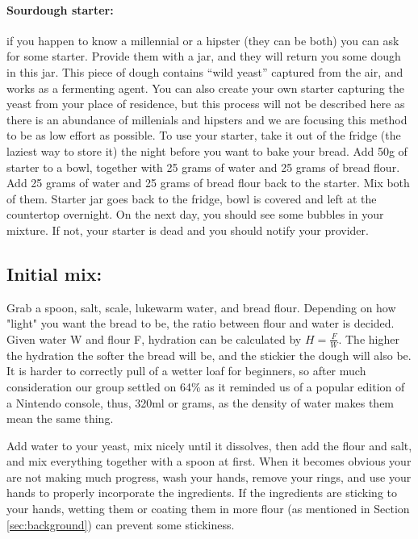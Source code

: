 \documentclass[acmtog, nonacm]{acmart}
\begin{document}
\paragraph{Sourdough starter:} if you happen to know a millennial or a hipster (they can be both) you can ask for some starter. 
Provide them with a jar, and they will return you some dough in this jar. 
This piece of dough contains ``wild yeast'' captured from the air, and works as a fermenting agent. 
You can also create your own starter capturing the yeast from your place of residence, but this process will not be described here as there is an abundance of millenials and hipsters and we are focusing this method to be as low effort as possible.
To use your starter, take it out of the fridge (the laziest way to store it) the night before you want to bake your bread.
Add 50g of starter to a bowl, together with 25 grams of water and 25 grams of bread flour.
Add 25 grams of water and 25 grams of bread flour back to the starter. 
Mix both of them. 
Starter jar goes back to the fridge, bowl is covered and left at the countertop overnight. 
On the next day, you should see some bubbles in your mixture.
If not, your starter is dead and you should notify your provider. 

\subsection{Initial mix:}
\label{sec:initialmix}

Grab a spoon, salt, scale, lukewarm water, and bread flour.
Depending on how "light" you want the bread to be, the ratio between flour and water is decided. 
Given water W and flour F, hydration can be calculated by $H = \frac{F}{W}$.
The higher the hydration the softer the bread will be, and the stickier the dough will also be. 
It is harder to correctly pull of a wetter loaf for beginners, so after much consideration our group settled on 64\% as it reminded us of a popular edition of a Nintendo console, thus, 320ml or grams, as the density of water makes them mean the same thing. 

Add water to your yeast, mix nicely until it dissolves, then add the flour and salt, and mix everything together with a spoon at first. 
When it becomes obvious your are not making much progress, wash your hands, remove your rings, and use your hands to properly incorporate the ingredients. 
If the ingredients are sticking to your hands, wetting them or coating them in more flour (as mentioned in Section \ref{sec:background}) can prevent some stickiness. 
\end{document}
